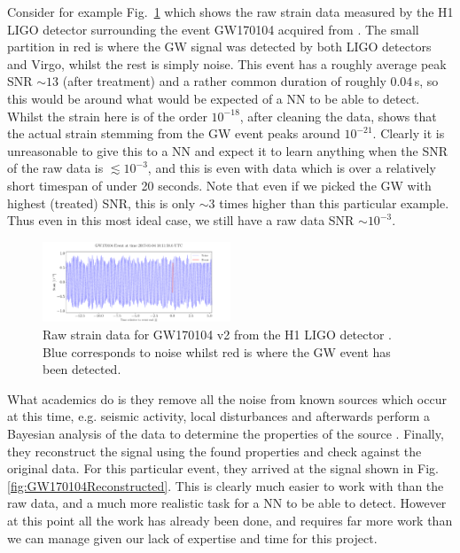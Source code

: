 \documentclass[%
reprint,
amsmath,amssymb,
aps,
]{revtex4-2}
\begin{document}
Consider for example Fig.~\ref{fig:GW170104GWEvent} which shows the raw strain data measured by the H1 LIGO detector surrounding the event GW170104 acquired from \cite{gwosc}. The small partition in red is where the GW signal was detected by both LIGO detectors and Virgo, whilst the rest is simply noise. This event has a roughly average peak SNR $\sim13$ (after treatment) and a rather common duration of roughly $0.04\,$s, so this would be around what would be expected of a NN to be able to detect. Whilst the strain here is of the order $10^{-18}$, after cleaning the data, \cite{LIGOScientific:2017bnn} shows that the actual strain stemming from the GW event peaks around $10^{-21}$. Clearly it is unreasonable to give this to a NN and expect it to learn anything when the SNR of the raw data is $\lesssim10^{-3}$, and this is even with data which is over a relatively short timespan of under 20 seconds. Note that even if we picked the GW with highest (treated) SNR, this is only $\sim3$ times higher than this particular example. Thus even in this most ideal case, we still have a raw data SNR $\sim10^{-3}$.

\begin{figure}[ht!]
	\includegraphics[width=0.5\textwidth]{Figures/GW170104GWEvent.pdf}
	\caption{Raw strain data for GW170104 v2 from the H1 LIGO detector \cite{gwosc}. Blue corresponds to noise whilst red is where the GW event has been detected.}
	\label{fig:GW170104GWEvent}
\end{figure}

What academics do is they remove all the noise from known sources which occur at this time, e.g. seismic activity, local disturbances and afterwards perform a Bayesian analysis of the data to determine the properties of the source \cite{LIGOScientific:2017bnn}. Finally, they reconstruct the signal using the found properties and check against the original data. For this particular event, they arrived at the signal shown in Fig. \ref{fig:GW170104Reconstructed}. This is clearly much easier to work with than the raw data, and a much more realistic task for a NN to be able to detect. However at this point all the work has already been done, and requires far more work than we can manage given our lack of expertise and time for this project.
\end{document}
